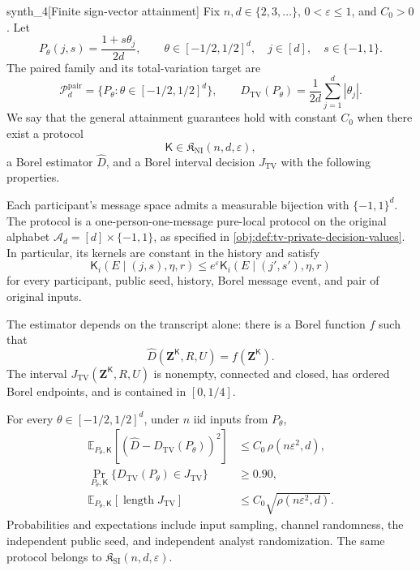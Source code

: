 \documentclass[11pt]{article}
\begin{document}
\begin{definitionv}{synth_4}[Finite sign-vector attainment]
Fix \(n,d\in\{2,3,\ldots\}\), \(0<\varepsilon\le1\), and \(C_0>0\). Let
\[
P_\theta(j,s)=\frac{1+s\theta_j}{2d},
\qquad
\theta\in[-1/2,1/2]^d,\quad j\in[d],\quad s\in\{-1,1\}.
\]
The paired family and its total-variation target are
\[
\mathcal P_d^{\mathrm{pair}}
=\{P_\theta:\theta\in[-1/2,1/2]^d\},
\qquad
D_{\mathrm{TV}}(P_\theta)
=\frac1{2d}\sum_{j=1}^d|\theta_j|.
\]
We say that the general attainment guarantees hold with constant \(C_0\) when there exist a protocol
\[
\mathsf K\in\mathfrak K_{\mathrm{NI}}(n,d,\varepsilon),
\]
a Borel estimator \(\widehat D\), and a Borel interval decision \(J_{\mathrm{TV}}\) with the following properties.

Each participant's message space admits a measurable bijection with \(\{-1,1\}^d\). The protocol is a one-person-one-message pure-local protocol on the original alphabet \(\mathcal A_d=[d]\times\{-1,1\}\), as specified in \cref{obj:def:tv-private-decision-values}. In particular, its kernels are constant in the history and satisfy
\[
\mathsf K_i(E\mid(j,s),\eta,r)
\le e^\varepsilon
\mathsf K_i(E\mid(j',s'),\eta,r)
\]
for every participant, public seed, history, Borel message event, and pair of original inputs.

The estimator depends on the transcript alone: there is a Borel function \(f\) such that
\[
\widehat D(\mathbf Z^{\mathsf K},R,U)=f(\mathbf Z^{\mathsf K}).
\]
The interval \(J_{\mathrm{TV}}(\mathbf Z^{\mathsf K},R,U)\) is nonempty, connected and closed, has ordered Borel endpoints, and is contained in \([0,1/4]\).

For every \(\theta\in[-1/2,1/2]^d\), under \(n\) iid inputs from \(P_\theta\),
\[
\begin{aligned}
\mathbb E_{P_\theta,\mathsf K}
\left[(\widehat D-D_{\mathrm{TV}}(P_\theta))^2\right]
&\le C_0\,\rho(n\varepsilon^2,d),\\
\Pr_{P_\theta,\mathsf K}
\{D_{\mathrm{TV}}(P_\theta)\in J_{\mathrm{TV}}\}
&\ge0.90,\\
\mathbb E_{P_\theta,\mathsf K}
\left[\operatorname{length}J_{\mathrm{TV}}\right]
&\le C_0\sqrt{\rho(n\varepsilon^2,d)}.
\end{aligned}
\]
Probabilities and expectations include input sampling, channel randomness, the independent public seed, and independent analyst randomization. The same protocol belongs to \(\mathfrak K_{\mathrm{SI}}(n,d,\varepsilon)\).
\end{definitionv}
\end{document}
